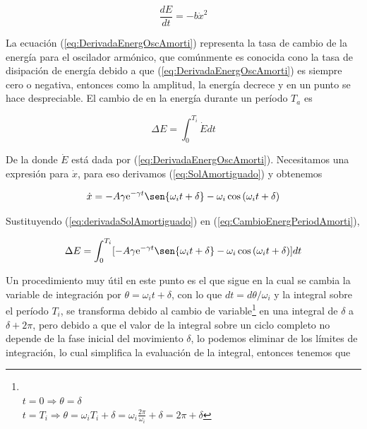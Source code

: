 \documentclass[a4paper,10pt]{article}
\newcommand{\euler}{\mathrm{e}}
\begin{document}
\begin{equation}
\frac{dE}{dt} = - b \dot{x}^2
\label{eq:DerivadaEnergOscAmorti}
\end{equation}

La ecuación (\ref{eq:DerivadaEnergOscAmorti}) representa la tasa de cambio de la
energía para el oscilador armónico, que comúnmente es conocida cono la tasa de 
disipación de energía debido a que (\ref{eq:DerivadaEnergOscAmorti})
es siempre cero o negativa, entonces como la amplitud, la energía decrece
y en un punto se hace despreciable. El cambio de en la energía durante un período
$T_a$ es 

\begin{equation}
 \Delta E = \int_0^{T_i} \dot{E} dt
 \label{eq:CambioEnergPeriodAmorti}
\end{equation}

De la donde $\dot{E}$ está dada por (\ref{eq:DerivadaEnergOscAmorti}). Necesitamos
una expresión para $\dot{x}$, para eso derivamos (\ref{eq:SolAmortiguado}) y obtenemos

\begin{equation}
 \dot{x} = - A\gamma \euler^{-\gamma t} \sen{\omega_i t + \delta} - \omega_i \cos{(\omega_i t + \delta)}
 \label{eq:derivadaSolAmortiguado}
\end{equation}

Sustituyendo (\ref{eq:derivadaSolAmortiguado}) en (\ref{eq:CambioEnergPeriodAmorti}),

\begin{equation}
 \Delta E = \int_0^{T_i} [- A\gamma \euler^{-\gamma t} \sen{\omega_i t + \delta} - \omega_i \cos{(\omega_i t + \delta)}] dt
\end{equation}

Un procedimiento muy útil en este punto es el que sigue \cite{fowles} en la cual
se cambia la variable de integración por $\theta = \omega_i t + \delta$, con lo que
$dt = d\theta / \omega_i$ y la integral sobre el período $T_i$, se transforma debido
al cambio de variable\footnote{\\$
 t = 0 \Rightarrow \theta = \delta 
 $ \\
 $t = T_i \Rightarrow \theta = \omega_i T_i + \delta = \omega_i \frac{2\pi}{\omega_i} + \delta = 2\pi + \delta
 $} en una integral de $\delta$ a $\delta + 2\pi$, pero debido a que el valor de la 
integral sobre un ciclo completo no depende de la fase inicial del movimiento $\delta$,
lo podemos eliminar de los límites de integración, lo cual simplifica la evaluación
de la integral, entonces tenemos que
\end{document}
